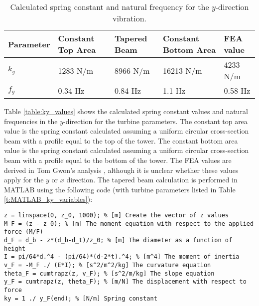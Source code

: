 \begin{table}[]
\caption{Calculated spring constant and natural frequency for the $y$-direction vibration.} \label{t:ky_values}
\begin{center}
\begin{tabular}{|m{1in}|m{1in}|m{1in}|m{1in}|m{1in}|}
\rowcolor[HTML]{EFEFEF} 
\hline
\textbf{Parameter} & \textbf{Constant Top Area} & \textbf{Tapered Beam} & \textbf{Constant Bottom Area} & \textbf{FEA value} \\ \hline
$k_y$ & 1283 N/m & 8966 N/m & 16213 N/m & 4233 N/m \\  \hline
$f_y$ & 0.34 Hz & 0.84 Hz & 1.1 Hz & 0.58 Hz\\ \hline
\end{tabular}
\end{center}
\end{table}

Table \ref{table:ky_values} shows the calculated spring constant values and natural frequencies in the $y$-direction for the turbine parameters.  The constant top area value is the spring constant calculated assuming a uniform circular cross-section beam with a profile equal to the top of the tower.  The constant bottom area value is the spring constant calculated assuming a uniform circular cross-section beam with a profile equal to the bottom of the tower.  The FEA values are derived in Tom Gwon's analysis \cite{Gwon_paper}, although it is unclear whether these values apply for the $y$ or $x$ direction.  The tapered beam calculation is performed in MATLAB using the following code (with turbine parameters listed in Table \ref{t:MATLAB_ky_variables}):

\begin{lstlisting}
z = linspace(0, z_0, 1000); % [m] Create the vector of z values
M_F = (z - z_0); % [m] The moment equation with respect to the applied force (M/F)
d_F = d_b - z*(d_b-d_t)/z_0; % [m] The diameter as a function of height
I = pi/64*d.^4 - (pi/64)*(d-2*t).^4; % [m^4] The moment of inertia
v_F = -M_F ./ (E*I); % [s^2/m^2/kg] The curvature equation
theta_F = cumtrapz(z, v_F); % [s^2/m/kg] The slope equation
y_F = cumtrapz(z, theta_F); % [m/N] The displacement with respect to force
ky = 1 ./ y_F(end); % [N/m] Spring constant
\end{lstlisting}
\FloatBarrier


